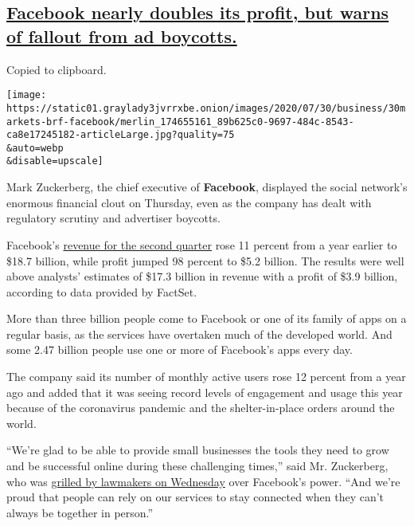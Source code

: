 \hypertarget{facebook-nearly-doubles-its-profit-but-warns-of-fallout-from-ad-boycotts}{%
\subsection{\texorpdfstring{\protect\hyperlink{facebook-nearly-doubles-its-profit-but-warns-of-fallout-from-ad-boycotts}{Facebook
nearly doubles its profit, but warns of fallout from ad
boycotts.}}{Facebook nearly doubles its profit, but warns of fallout from ad boycotts.}}\label{facebook-nearly-doubles-its-profit-but-warns-of-fallout-from-ad-boycotts}}

Copied to clipboard.

\texttt{[image: https://static01.graylady3jvrrxbe.onion/images/2020/07/30/business/30markets-brf-facebook/merlin\_174655161\_89b625c0-9697-484c-8543-ca8e17245182-articleLarge.jpg?quality=75\\\&auto=webp\\\&disable=upscale]}

Mark Zuckerberg, the chief executive of \textbf{Facebook}, displayed the
social network's enormous financial clout on Thursday, even as the
company has dealt with regulatory scrutiny and advertiser boycotts.

Facebook's
\href{https://investor.fb.com/investor-news/press-release-details/2020/Facebook-Reports-Second-Quarter-2020-Results/default.aspx}{revenue
for the second quarter} rose 11 percent from a year earlier to \$18.7
billion, while profit jumped 98 percent to \$5.2 billion. The results
were well above analysts' estimates of \$17.3 billion in revenue with a
profit of \$3.9 billion, according to data provided by FactSet.

More than three billion people come to Facebook or one of its family of
apps on a regular basis, as the services have overtaken much of the
developed world. And some 2.47 billion people use one or more of
Facebook's apps every day.

The company said its number of monthly active users rose 12 percent from
a year ago and added that it was seeing record levels of engagement and
usage this year because of the coronavirus pandemic and the
shelter-in-place orders around the world.

``We're glad to be able to provide small businesses the tools they need
to grow and be successful online during these challenging times,'' said
Mr. Zuckerberg, who was
\href{https://www.nytimes3xbfgragh.onion/2020/07/29/technology/big-tech-hearing-apple-amazon-facebook-google.html}{grilled
by lawmakers on Wednesday} over Facebook's power. ``And we're proud that
people can rely on our services to stay connected when they can't always
be together in person.''

